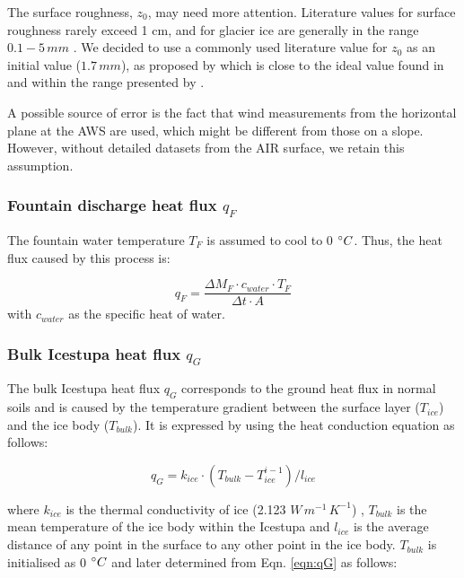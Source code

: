 \documentclass[utf8]{frontiersSCNS} %
\begin{document}
The surface roughness, $z_{0}$, may need more attention. Literature values for surface roughness rarely exceed 1 cm, and
for glacier ice are generally in the range $0.1-5\, mm$ \citet{BrockWillisSharp_2006}. We decided to use a commonly used
literature value for $z_{0}$ as an initial value ($1.7\,mm$), as proposed by \cite{CuffeyPaterson_2010} which is close
to the ideal value found in \cite{reid_brock_2014} and within the range presented by \cite{BrockWillisSharp_2006}.

A possible source of error is the fact that wind measurements from the horizontal plane at the AWS are used, which might
be different from those on a slope. However, without detailed datasets from the AIR surface, we retain this assumption.

\subsubsection{Fountain discharge heat flux \texorpdfstring{$q_{F}$}{Lg} }

The fountain water temperature $T_F$ is assumed to cool to 0 $\degree C$. Thus, the heat flux caused by this process is:

\begin{equation}
	q_{F} = \frac{ \Delta M_F \cdot c_{water} \cdot T_F}{\Delta t \cdot A}
	\label{eqn:qF}
\end{equation}
with $c_{water}$ as the specific heat of water.

\subsubsection{Bulk Icestupa heat flux \texorpdfstring{$q_{G}$}{Lg}} \label{sec:Bulkflux}

The bulk Icestupa heat flux $q_{G}$ corresponds to the ground heat flux in normal soils and is caused by the temperature
gradient between the surface layer ($T_{ice}$) and the ice body ($T_{bulk}$). It is expressed by using the heat
conduction equation as follows:

\begin{equation} q_{G} = k_{ice} \cdot (T_{bulk}-T_{ice}^{i-1})/l_{ice} \label{eqn:qG}    \end{equation}

where $k_{ice}$ is the thermal conductivity of ice (2.123 $W\, m^{-1}\,K^{-1}$) , $T_{bulk}$ is the mean temperature of
the ice body within the Icestupa and $l_{ice}$ is the average distance of any point in the surface to any other point in
the ice body. $T_{bulk}$ is initialised as 0 $\degree C$ and later determined from Eqn. \ref{eqn:qG} as follows:
\end{document}
